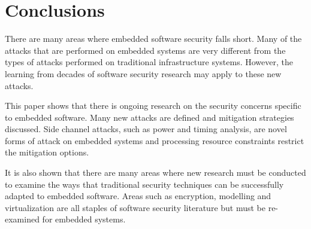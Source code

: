 \documentclass[final,conference,11pt]{IEEEtran}
\begin{document}
\section{Conclusions}

There are many areas where embedded software security falls short.  Many of the attacks that are performed on embedded systems are very different from the types of attacks performed on traditional infrastructure systems.  However, the learning from decades of software security research may apply to these new attacks.  

This paper shows that there is ongoing research on the security concerns specific to embedded software.  Many new attacks are defined and mitigation strategies discussed.  Side channel attacks, such as power and timing analysis, are novel forms of attack on embedded systems and processing resource constraints restrict the mitigation options. 

It is also shown that there are many areas where new research must be conducted to examine the ways that traditional security techniques can be successfully adapted to embedded software. Areas such as encryption, modelling and virtualization are all staples of software security literature but must be re-examined for embedded systems.


\end{document}

